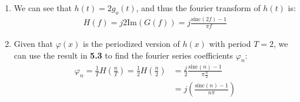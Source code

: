 \documentclass{article}
\begin{document}
\begin{enumerate}[label=6.\arabic*]
    \item We can see that $h(t) = 2g_o(t)$, and thus the fourier transform of $h(t)$ is:
    \begin{align*}
        H(f) = j2\text{Im}(G(f)) = j \frac{\text{sinc}(2f) - 1}{\pi f}
    \end{align*}

    \item Given that $\varphi(x)$ is the periodized version of $h(x)$ with period $T=2$, we can use the result in \textbf{5.3} to find the fourier series coefficients $\varphi_n$:
    \begin{align*}
        \varphi_n = \frac{1}{T} H\left(\frac{n}{T}\right) = \frac{1}{2} H\left(\frac{n}{2}\right) &= \frac{j}{2} \frac{\text{sinc}(n) - 1}{\pi \frac{n}{2}} \\
        &= j\left(\frac{\text{sinc}(n) - 1}{n\pi}\right)
    \end{align*}
\end{enumerate}

\end{document}
